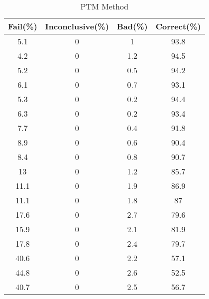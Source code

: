 \documentclass[]{aiaa-tc}%
\begin{document}
\begin{table}[h!]
  \centering
     \begin{tabular}{|c|c|c|c|}
    \toprule
    Fail(\%)  & Inconclusive(\%) & Bad(\%)   & Correct(\%) \\
    \midrule
    5.1   & 0     & 1     & 93.8 \\
    4.2   & 0     & 1.2   & 94.5 \\
    5.2   & 0     & 0.5   & 94.2 \\
    6.1   & 0     & 0.7   & 93.1 \\
    5.3   & 0     & 0.2   & 94.4 \\
    6.3   & 0     & 0.2   & 93.4 \\
    7.7   & 0     & 0.4   & 91.8 \\
    8.9   & 0     & 0.6   & 90.4 \\
    8.4   & 0     & 0.8   & 90.7 \\
    13    & 0     & 1.2   & 85.7 \\
    11.1  & 0     & 1.9   & 86.9 \\
    11.1  & 0     & 1.8   & 87 \\
    17.6  & 0     & 2.7   & 79.6 \\
    15.9  & 0     & 2.1   & 81.9 \\
    17.8  & 0     & 2.4   & 79.7 \\
    40.6  & 0     & 2.2   & 57.1 \\
    44.8  & 0     & 2.6   & 52.5 \\
    40.7  & 0     & 2.5   & 56.7 \\
        \bottomrule
    \end{tabular}%
     \caption{PTM Method}
  \label{tab:addlabel}%
\end{table}%
\end{document}
